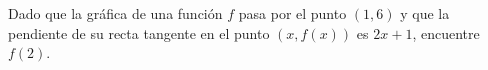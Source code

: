 \item Dado que la gráfica de una función $f$ pasa por el punto $(1, 6)$ y que la pendiente de su recta tangente en el punto $(x, f(x))$ es $2x + 1$, encuentre $f(2)$.
